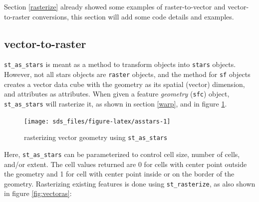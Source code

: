 \documentclass[]{book}
\newenvironment{Shaded}{\begin{snugshade}}{\end{snugshade}}
\newcommand{\CommentTok}[1]{\textcolor[rgb]{0.56,0.35,0.01}{\textit{#1}}}
\newcommand{\DataTypeTok}[1]{\textcolor[rgb]{0.13,0.29,0.53}{#1}}
\newcommand{\KeywordTok}[1]{\textcolor[rgb]{0.13,0.29,0.53}{\textbf{#1}}}
\newcommand{\NormalTok}[1]{#1}
\newcommand{\OperatorTok}[1]{\textcolor[rgb]{0.81,0.36,0.00}{\textbf{#1}}}
\newcommand{\StringTok}[1]{\textcolor[rgb]{0.31,0.60,0.02}{#1}}
\begin{document}
Section \ref{rasterize} already showed some examples of
raster-to-vector and vector-to-raster conversions, this section
will add some code details and examples.

\hypertarget{vector-to-raster}{%
\subsection{vector-to-raster}\label{vector-to-raster}}

\texttt{st\_as\_stars} is meant as a method to transform objects into \texttt{stars}
objects. However, not all stars objects are \texttt{raster} objects,
and the method for \texttt{sf} objects creates a vector data cube with
the geometry as its spatial (vector) dimension, and attributes
as attributes. When given a feature \emph{geometry} (\texttt{sfc}) object,
\texttt{st\_as\_stars} will rasterize it, as shown in section \ref{warp},
and in figure \ref{fig:asstars}.



\begin{Shaded}
\end{Shaded}

\begin{figure}

{\centering \texttt{[image: sds\_files/figure-latex/asstars-1]} 

}

\caption{rasterizing vector geometry using \texttt{st\_as\_stars}}\label{fig:asstars}
\end{figure}

Here, \texttt{st\_as\_stars} can be parameterized to control cell size,
number of cells, and/or extent. The cell values returned are 0 for
cells with center point outside the geometry and 1 for cell with
center point inside or on the border of the geometry. Rasterizing
existing features is done using \texttt{st\_rasterize}, as also shown in
figure \ref{fig:vectoras}:
\end{document}
